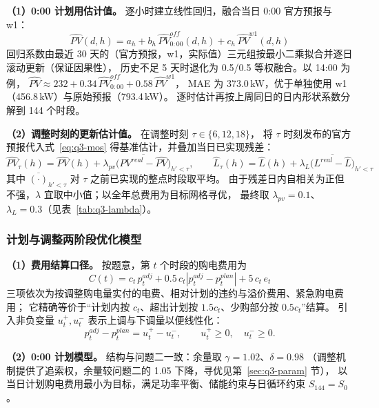 \textbf{（1）0:00 计划用估计值。} 逐小时建立线性回归\cite{fpp3}，融合当日 0:00 官方预报与 w1：
\begin{equation}
\widehat{PV}(d,h)=a_h+b_h\,\widehat{PV}^{off}_{0:00}(d,h)+c_h\,\widehat{PV}^{w1}(d,h)
\label{eq:q3-mos}
\end{equation}
回归系数由最近 30 天的（官方预报，w1，实际值）三元组按最小二乘拟合并逐日滚动更新（保证因果性），
历史不足 5 天时退化为 0.5/0.5 等权融合。以 14:00 为例，
$\widehat{PV}\approx232+0.34\,\widehat{PV}^{off}_{0:00}+0.58\,\widehat{PV}^{w1}$，
MAE 为 373.0\,kW，优于单独使用 w1（456.8\,kW）与原始预报（793.4\,kW）。
逐时估计再按上周同日的日内形状系数分解到 144 个时段。

\textbf{（2）调整时刻的更新估计值。} 在调整时刻 $\tau\in\{6,12,18\}$，
将 $\tau$ 时刻发布的官方预报代入式~\eqref{eq:q3-mos} 得基准估计，并叠加当日已实现残差：
\begin{equation}
\widehat{PV}_\tau(h)=\widehat{PV}(h)+\lambda_{pv}\overline{\Big(PV^{real}-\widehat{PV}\Big)}_{h'<\tau},\qquad
\widehat{L}_\tau(h)=\widehat{L}(h)+\lambda_L\overline{\Big(L^{real}-\widehat{L}\Big)}_{h'<\tau}
\label{eq:q3-resid}
\end{equation}
其中 $\overline{(\cdot)}_{h'<\tau}$ 对 $\tau$ 之前已实现的整点时段取平均。
由于残差日内自相关为正但不强，$\lambda$ 宜取中小值；以全年总费用为目标网格寻优，
最终取 $\lambda_{pv}=0.1$、$\lambda_L=0.3$（见表~\ref{tab:q3-lambda}）。

\subsubsection{计划与调整两阶段优化模型}
\textbf{（1）费用结算口径。} 按题意，第 $t$ 个时段的购电费用为
\begin{equation}
C(t)=c_t\,p^{adj}_t+0.5\,c_t\left|p^{adj}_t-p^{plan}_t\right|+5\,c_t\,e_t
\label{eq:q3-cost}
\end{equation}
三项依次为按调整购电量实付的电费、相对计划的违约与溢价费用、紧急购电费用；
它精确等价于“计划内按 $c_t$、超出计划按 $1.5c_t$、少购部分按 $0.5c_t$”结算。
引入非负变量 $u^{+}_t,u^{-}_t$ 表示上调与下调量以便线性化：
\begin{equation}
p^{adj}_t-p^{plan}_t=u^{+}_t-u^{-}_t,\qquad u^{+}_t\ge0,\quad u^{-}_t\ge0 .
\label{eq:q3-split}
\end{equation}

\textbf{（2）0:00 计划模型。} 结构与问题二一致：余量取 $\gamma=1.02$、$\delta=0.98$
（调整机制提供了追索权，余量较问题二的 1.05 下降，寻优见第~\ref{sec:q3-param} 节），
以当日计划购电费用最小为目标，满足功率平衡、储能约束与日循环约束 $S_{144}=S_0$。

